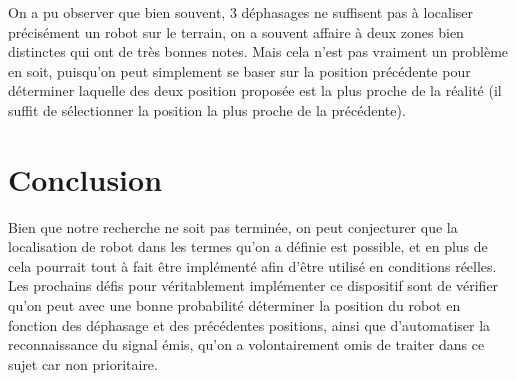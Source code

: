 \documentclass[12pt,a4paper]{report}
\begin{document}
On a pu observer que bien souvent, 3 déphasages ne suffisent pas à localiser précisément un robot sur le terrain, on a souvent affaire à deux zones bien distinctes qui ont de très bonnes notes. Mais cela n'est pas vraiment un problème en soit, puisqu'on peut simplement se baser sur la position précédente pour déterminer laquelle des deux position proposée est la plus proche de la réalité (il suffit de sélectionner la position la plus proche de la précédente).

\chapter{Conclusion}
Bien que notre recherche ne soit pas terminée, on peut conjecturer que la localisation de robot dans les termes qu'on a définie est possible, et en plus de cela pourrait tout à fait être implémenté afin d'être utilisé en conditions réelles. Les prochains défis pour véritablement implémenter ce dispositif sont de vérifier qu'on peut avec une bonne probabilité déterminer la position du robot en fonction des déphasage et des précédentes positions, ainsi que d'automatiser la reconnaissance du signal émis, qu'on a volontairement omis de traiter dans ce sujet car non prioritaire.

%



\end{document}
